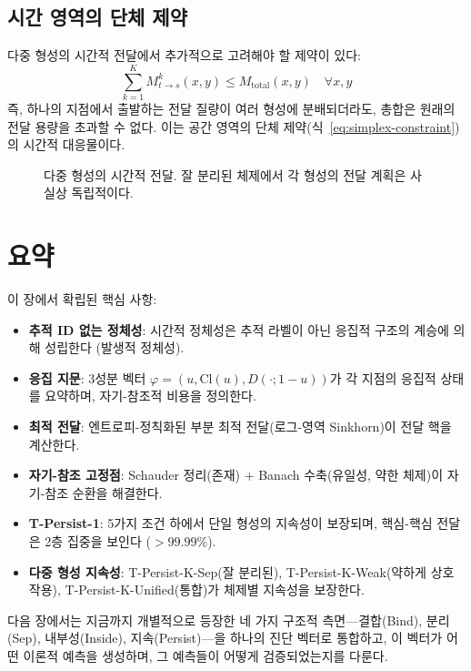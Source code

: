 \subsection{시간 영역의 단체 제약}

다중 형성의 시간적 전달에서 추가적으로 고려해야 할 제약이 있다:
\begin{equation}
    \sum_{k=1}^{K} M^k_{t \to s}(x, y) \leq M_{\mathrm{total}}(x, y) \quad \forall x, y
    \label{eq:temporal-simplex}
\end{equation}
즉, 하나의 지점에서 출발하는 전달 질량이 여러 형성에 분배되더라도, 총합은 원래의 전달 용량을 초과할 수 없다. 이는 공간 영역의 단체 제약(식~\eqref{eq:simplex-constraint})의 시간적 대응물이다.

\begin{figure}[t]
\centering
{}
\caption{다중 형성의 시간적 전달. 잘 분리된 체제에서 각 형성의 전달 계획은 사실상 독립적이다.}
\label{fig:multi-temporal-transport}
\end{figure}


\section{요약}
\label{sec:transport-summary}

이 장에서 확립된 핵심 사항:

\begin{itemize}
    \item \textbf{추적 ID 없는 정체성}: 시간적 정체성은 추적 라벨이 아닌 응집적 구조의 계승에 의해 성립한다 (발생적 정체성).

    \item \textbf{응집 지문}: 3성분 벡터 $\varphi = (u, \mathrm{Cl}(u), D(\cdot; 1-u))$가 각 지점의 응집적 상태를 요약하며, 자기-참조적 비용을 정의한다.

    \item \textbf{최적 전달}: 엔트로피-정칙화된 부분 최적 전달(로그-영역 Sinkhorn)이 전달 핵을 계산한다.

    \item \textbf{자기-참조 고정점}: Schauder 정리(존재) + Banach 수축(유일성, 약한 체제)이 자기-참조 순환을 해결한다.

    \item \textbf{T-Persist-1}: 5가지 조건 하에서 단일 형성의 지속성이 보장되며, 핵심-핵심 전달은 2층 집중을 보인다 ($>99.99\%$).

    \item \textbf{다중 형성 지속성}: T-Persist-K-Sep(잘 분리된), T-Persist-K-Weak(약하게 상호작용), T-Persist-K-Unified(통합)가 체제별 지속성을 보장한다.
\end{itemize}

다음 장에서는 지금까지 개별적으로 등장한 네 가지 구조적 측면---결합(Bind), 분리(Sep), 내부성(Inside), 지속(Persist)---을 하나의 진단 벡터로 통합하고, 이 벡터가 어떤 이론적 예측을 생성하며, 그 예측들이 어떻게 검증되었는지를 다룬다.
